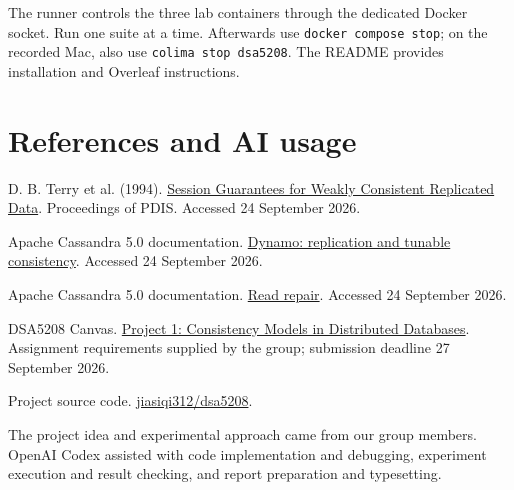 \documentclass[lang=en,11pt,a4paper,bibend=bibtex]{elegantpaper}
\begin{document}
The runner controls the three lab containers through the dedicated Docker socket. Run one suite at a time. Afterwards use \texttt{docker compose stop}; on the recorded Mac, also use \texttt{colima stop dsa5208}. The README provides installation and Overleaf instructions.

\section*{References and AI usage}
\begin{enumerate}[label={[\arabic*]},leftmargin=1.8em,itemsep=6pt]
\item\label{ref:1} D. B. Terry et al. (1994). \href{https://www.cs.cornell.edu/courses/cs734/2000FA/cached\%20papers/SessionGuaranteesPDIS_1.html}{Session Guarantees for Weakly Consistent Replicated Data}. Proceedings of PDIS. Accessed 24 September 2026.
\item\label{ref:2} Apache Cassandra 5.0 documentation. \href{https://cassandra.apache.org/doc/stable/cassandra/architecture/dynamo.html}{Dynamo: replication and tunable consistency}. Accessed 24 September 2026.
\item\label{ref:3} Apache Cassandra 5.0 documentation. \href{https://cassandra.apache.org/doc/stable/cassandra/managing/operating/read_repair.html}{Read repair}. Accessed 24 September 2026.
\item\label{ref:4} DSA5208 Canvas. \href{https://canvas.nus.edu.sg/courses/97072/assignments/273833}{Project 1: Consistency Models in Distributed Databases}. Assignment requirements supplied by the group; submission deadline 27 September 2026.
\item\label{ref:5} Project source code. \href{https://github.com/jiasiqi312/dsa5208/tree/review-316}{jiasiqi312/dsa5208}.
\item\label{ref:6} The project idea and experimental approach came from our group members. OpenAI Codex assisted with code implementation and debugging, experiment execution and result checking, and report preparation and typesetting.
\end{enumerate}
\end{document}
